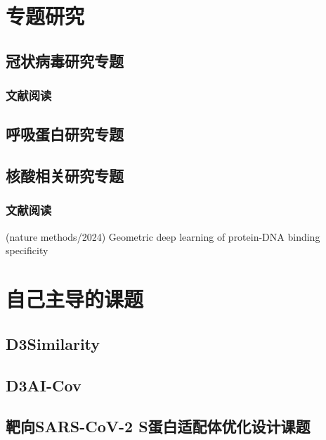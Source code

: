 \chapter{专题研究}
\section{冠状病毒研究专题}
\subsection{文献阅读}
\section{呼吸蛋白研究专题}
\section{核酸相关研究专题}
\subsection{文献阅读}
\noindent * (nature methods/2024) Geometric deep learning of protein-DNA binding specificity 

\chapter{自己主导的课题}
\section{D3Similarity}
\section{D3AI-Cov}
\section{靶向SARS-CoV-2 S蛋白适配体优化设计课题}
